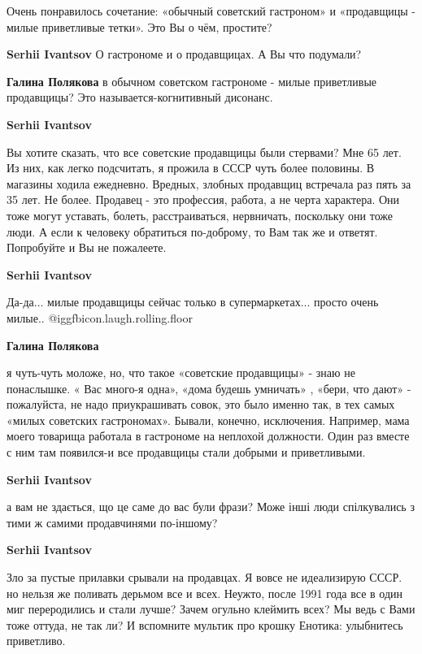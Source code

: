 \begin{itemize}
Очень понравилось сочетание: «обычный советский гастроном» и «продавщицы -
милые приветливые тетки». Это Вы о чём, простите?

\begin{itemize} %
\textbf{Serhii Ivantsov} О гастрономе и о продавщицах. А Вы что подумали?

\begin{itemize} %
\textbf{Галина Полякова} в обычном советском гастрономе - милые приветливые продавщицы? Это называется-когнитивный дисонанс.

\textbf{Serhii Ivantsov} 

Вы хотите сказать, что все советские продавщицы были стервами? Мне 65 лет. Из
них, как легко подсчитать, я прожила в СССР чуть более половины. В магазины
ходила ежедневно. Вредных, злобных продавщиц встречала раз пять за 35 лет. Не
более. Продавец - это профессия, работа, а не черта характера. Они тоже могут
уставать, болеть, расстраиваться, нервничать, поскольку они тоже люди. А если к
человеку обратиться по-доброму, то Вам так же и ответят. Попробуйте и Вы не
пожалеете.

\textbf{Serhii Ivantsov} 

Да-да... милые продавщицы сейчас только в супермаркетах... просто очень милые..
@igg{fbicon.laugh.rolling.floor} 

\textbf{Галина Полякова}

я чуть-чуть моложе, но, что такое «советские продавщицы» - знаю не понаслышке.
« Вас много-я одна», «дома будешь умничать» , «бери, что дают» - пожалуйста,
не надо приукрашивать совок, это было именно так, в тех самых «милых советских
гастрономах». Бывали, конечно, исключения. Например, мама моего товарища
работала в гастрономе на неплохой должности. Один раз вместе с ним там
появился-и все продавщицы стали добрыми и приветливыми.

\textbf{Serhii Ivantsov} 

а вам не здається, що це саме до вас були фрази? Може інші люди спілкувались з
тими ж самими продавчинями по-іншому?

\textbf{Serhii Ivantsov} 

Зло за пустые прилавки срывали на продавцах. Я вовсе не идеализирую СССР. но
нельзя же поливать дерьмом все и всех. Неужто, после 1991 года все в один миг
переродились и стали лучше? Зачем огульно клеймить всех? Мы ведь с Вами тоже
оттуда, не так ли? И вспомните мультик про крошку Енотика: улыбнитесь
приветливо.


\end{itemize}
\end{itemize}
\end{itemize}
